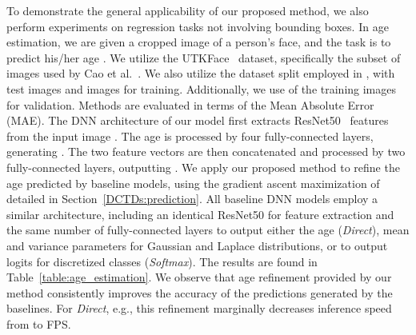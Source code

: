 \documentclass[runningheads]{llncs}
\begin{document}
To demonstrate the general applicability of our proposed method, we also perform experiments on regression tasks not involving bounding boxes. In age estimation, we are given a cropped image  of a person's face, and the task is to predict his/her age . We utilize the UTKFace~\cite{zhang2017age} dataset, specifically the subset of  images used by Cao et al.~\cite{cao2019consistent}. We also utilize the dataset split employed in \cite{cao2019consistent}, with  test images and  images for training. Additionally, we use  of the training images for validation. Methods are evaluated in terms of the Mean Absolute Error (MAE). The DNN architecture  of our model first extracts ResNet50~\cite{he2016deep} features  from the input image . The age  is processed by four fully-connected layers, generating . The two feature vectors are then concatenated and processed by two fully-connected layers, outputting . We apply our proposed method to refine the age predicted by baseline models, using the gradient ascent maximization of  detailed in Section~\ref{DCTDs:prediction}. All baseline DNN models employ a similar architecture, including an identical ResNet50 for feature extraction and the same number of fully-connected layers to output either the age  (\textit{Direct}), mean and variance parameters for Gaussian and Laplace distributions, or to output logits for  discretized classes (\textit{Softmax}). The results are found in Table~\ref{table:age_estimation}. We observe that age refinement provided by our method consistently improves the accuracy of the predictions generated by the baselines. For \textit{Direct}, e.g., this refinement marginally decreases inference speed from  to  FPS.




















\begin{table*}[t]
\centering
\caption{Results for the head-pose estimation task on the BIWI~\cite{fanelli2013random} dataset. Gradient-based refinement using our proposed method consistently improves the average MAE (lower is better) for yaw, pitch and roll for the predicted pose produced by our baselines.}
\label{table:head_pose_estimation}\end{table*}
\end{document}
